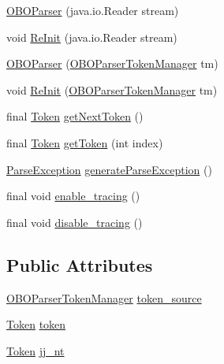 \begin{DoxyCompactItemize}
\hyperlink{classorg_1_1coode_1_1owlapi_1_1obo_1_1parser_1_1_o_b_o_parser_ad0f370b9e4d1f22db25d57ebd77653bc}{O\-B\-O\-Parser} (java.\-io.\-Reader stream)
\item 
void \hyperlink{classorg_1_1coode_1_1owlapi_1_1obo_1_1parser_1_1_o_b_o_parser_a78e8979520f74b9e265c016a425e39d6}{Re\-Init} (java.\-io.\-Reader stream)
\item 
\hyperlink{classorg_1_1coode_1_1owlapi_1_1obo_1_1parser_1_1_o_b_o_parser_a44a3df6266e3f683f0837358d2e39d5c}{O\-B\-O\-Parser} (\hyperlink{classorg_1_1coode_1_1owlapi_1_1obo_1_1parser_1_1_o_b_o_parser_token_manager}{O\-B\-O\-Parser\-Token\-Manager} tm)
\item 
void \hyperlink{classorg_1_1coode_1_1owlapi_1_1obo_1_1parser_1_1_o_b_o_parser_a36afd783e319b77f87cb1753657ff2af}{Re\-Init} (\hyperlink{classorg_1_1coode_1_1owlapi_1_1obo_1_1parser_1_1_o_b_o_parser_token_manager}{O\-B\-O\-Parser\-Token\-Manager} tm)
\item 
final \hyperlink{classorg_1_1coode_1_1owlapi_1_1obo_1_1parser_1_1_token}{Token} \hyperlink{classorg_1_1coode_1_1owlapi_1_1obo_1_1parser_1_1_o_b_o_parser_a08ad420a112c997bb7151fd840d6b7e2}{get\-Next\-Token} ()
\item 
final \hyperlink{classorg_1_1coode_1_1owlapi_1_1obo_1_1parser_1_1_token}{Token} \hyperlink{classorg_1_1coode_1_1owlapi_1_1obo_1_1parser_1_1_o_b_o_parser_ae2ad3d0a759804a3c29249f0a73e7e3e}{get\-Token} (int index)
\item 
\hyperlink{classorg_1_1coode_1_1owlapi_1_1obo_1_1parser_1_1_parse_exception}{Parse\-Exception} \hyperlink{classorg_1_1coode_1_1owlapi_1_1obo_1_1parser_1_1_o_b_o_parser_aed1055b985a224eb0718e242c4702533}{generate\-Parse\-Exception} ()
\item 
final void \hyperlink{classorg_1_1coode_1_1owlapi_1_1obo_1_1parser_1_1_o_b_o_parser_ab233a14390e2f2073a2bb08a77bc860a}{enable\-\_\-tracing} ()
\item 
final void \hyperlink{classorg_1_1coode_1_1owlapi_1_1obo_1_1parser_1_1_o_b_o_parser_abcd52c5c001a2dd957ce8fa169fc8761}{disable\-\_\-tracing} ()
\end{DoxyCompactItemize}
\subsection*{Public Attributes}
\begin{DoxyCompactItemize}
\item 
\hyperlink{classorg_1_1coode_1_1owlapi_1_1obo_1_1parser_1_1_o_b_o_parser_token_manager}{O\-B\-O\-Parser\-Token\-Manager} \hyperlink{classorg_1_1coode_1_1owlapi_1_1obo_1_1parser_1_1_o_b_o_parser_a37e4504977c2e29f922fbb9116ca0184}{token\-\_\-source}
\item 
\hyperlink{classorg_1_1coode_1_1owlapi_1_1obo_1_1parser_1_1_token}{Token} \hyperlink{classorg_1_1coode_1_1owlapi_1_1obo_1_1parser_1_1_o_b_o_parser_a6898b30760c30032a7ba8e84ae4188d8}{token}
\item 
\hyperlink{classorg_1_1coode_1_1owlapi_1_1obo_1_1parser_1_1_token}{Token} \hyperlink{classorg_1_1coode_1_1owlapi_1_1obo_1_1parser_1_1_o_b_o_parser_ae8d52dd97ecee03866132a2814ce0945}{jj\-\_\-nt}
\end{DoxyCompactItemize}
